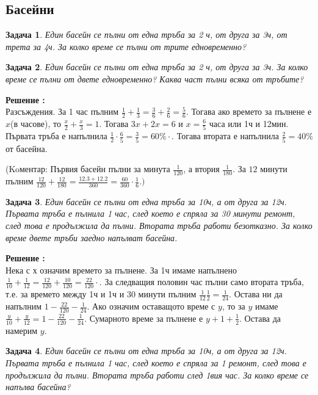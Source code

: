 \documentclass{article}
\newtheorem{problem}{Задача}
\newcounter{solution}
\newcommand\solution{%
	\stepcounter{solution}%
	\textbf{Решение :}\\%
}
\begin{document}
\subsection{Басейни}

\begin{problem}
	Един басейн се пълни от една тръба за 2 ч, от друга за 3ч, от трета за 4ч. За колко време се пълни от трите едновременно? 
\end{problem}


\begin{problem}
	Един басейн се пълни от една тръба за 2 ч, от друга за 3ч. За колко време се пълни от двете едновременно? Каква част пълни всяка от тръбите?
\end{problem}

\solution
Разсъждения. За 1 час пълним $\frac{1}{2} + \frac{1}{3} = \frac{3}{6} + \frac{2}{6} = \frac{5}{6}$. Тогава ако времето за пълнене е $x$(в часове), то $\frac{x}{2} + \frac{x}{3} = 1 $. Тогава $3x + 2x = 6 $ и  $ x = \frac{6}{5}$ часа или 1ч и 12мин. Първата тръба е напълнила $\frac{1}{2}\cdot \frac{6}{5} = \frac{3}{5} = 60\% \cdot $. Тогава втората е напълнила $\frac{2}{5} = 40\%$ от басейна.
 
(Koментар: Първия басейн пълни за минута $\frac{1}{120}$, а втория $\frac{1}{180}.$ За $12$ минути пълним $\frac{12}{120} + \frac{12}{180} = \frac{12.3 + 12.2}{360} = \frac{60}{360} \cdot \frac{1}{6}. )$


\begin{problem}
	Един басейн се пълни от една тръба за 10ч, а от друга за 12ч. Първата тръба е пълнила 1 час, след което е спряла за 30 минути ремонт, след това е продължила да пълни. Втората тръба работи безотказно. За колко време двете тръби заедно напълват басейна.
\end{problem}
\solution 
 Нека с х означим времето за пълнене. За 1ч имаме напълнено $\frac{1}{10} + \frac{1}{12} = \frac{12}{120} + \frac{10}{120} = \frac{22}{120} \cdot$. За следващия половин час пълни само втората тръба, т.е. за времето между 1ч и 1ч и 30 минути пълним $\frac{1}{12} \frac{1}{2} = \frac{1}{24}.$ Остава ни да напълним $1 - \frac{22}{120} - \frac{1}{24}.$ Ако означим оставащото време с $y$, то за $y$ имаме $ \frac{y}{10} + \frac{y}{12} =  1 - \frac{22}{120} - \frac{1}{24}$. Сумарното време за пълнене е $y+1+\frac{1}{2}$. Остава да намерим $y$.



\begin{problem}
	Един басейн се пълни от една тръба за 10ч, а от друга за 12ч. Първата тръба е пълнила 1 час, след което е спряла за 1 ремонт, след това е продължила да пълни. Втората тръба работи след 1вия час. За колко време се напълва басейна?
\end{problem}
\end{document}

